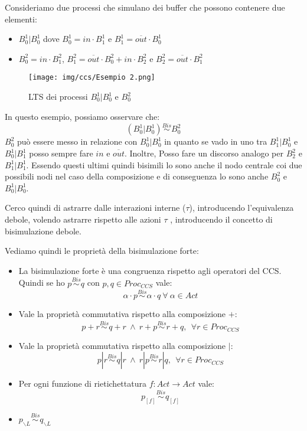 \begin{esempio}
    Consideriamo due processi che simulano dei buffer che possono contenere due
    elementi:
    \begin{itemize}
        \item $B_0^1 | B_0^1$ dove $B_0^1 = in \cdot B_1^1$ e $B_1^1 = \overline{out} \cdot B_0^1$
        \item $B_0^2 = in \cdot B_1^2$, $B_1^2= \overline{out} \cdot B_0^2 + in \cdot B_2^2$ e $B_2^2 = \overline{out} \cdot B_1^2$
    \end{itemize}

    \begin{figure}[!ht]
        \centering
        \texttt{[image: img/ccs/Esempio 2.png]}
        \caption{LTS dei processi $B_0^1 | B_0^1$ e $B_0^2$}
    \end{figure}

    In questo esempio, possiamo osservare che: $$(B_0^1 | B_0^1) \stackrel{Bis}{\sim} B_0^2$$
    $B_0^2$ può essere messo in relazione con $B_0^1| B_0^1$ in quanto se vado
    in uno tra $B_1^1 | B_0^1$ e $B_0^1 | B_1^1$ posso sempre fare $in$ e $\overline{out}$.
    Inoltre, Posso fare un discorso analogo per $B_2^2$ e $B_1^1 | B_1^1$.
    Essendo questi ultimi quindi bisimili lo sono anche il nodo centrale coi
    due possibili nodi nel caso della composizione e di conseguenza lo sono
    anche $B_0^2$ e $B_0^1 | B_0^1$.
\end{esempio}

Cerco quindi di astrarre dalle interazioni interne ($\tau$), introducendo
l'equivalenza debole, volendo astrarre rispetto alle azioni $\tau$ , introducendo
il concetto di bisimulazione debole.

Vediamo quindi le proprietà della bisimulazione forte:
\begin{itemize}
    \item La bisimulazione forte è una congruenza rispetto agli operatori del CCS.
          Quindi se ho $p \stackrel{Bis}{\sim} q$ con $p, q \in Proc_{CCS}$ vale:
          $$\alpha \cdot p \stackrel{Bis}{\sim}  \alpha \cdot q \ \forall \ \alpha \in Act$$
    \item Vale la proprietà commutativa rispetto alla composizione $+$:
          $$p + r \stackrel{Bis}{\sim} q + r \ \land \ r + p \stackrel{Bis}{\sim} r + q, \ \ \forall r \in Proc_{CCS}$$
    \item Vale la proprietà commutativa rispetto alla composizione $|$:
          $$p | r \stackrel{Bis}{\sim} q | r \ \land \ r | p \stackrel{Bis}{\sim} r | q, \ \ \forall r \in Proc_{CCS}$$
    \item Per ogni funzione di rietichettatura $f : Act \to Act$ vale:
          $$p_{[f]} \stackrel{Bis}{\sim} q_{[f]}$$
    \item $p_{\backslash L} \stackrel{Bis}{\sim} q_{\backslash L}$
\end{itemize}


